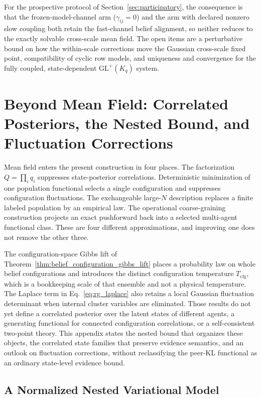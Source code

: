 \documentclass[11pt]{article}
\begin{document}
For the prospective protocol of Section~\ref{sec:participatory}, the consequence is that the frozen-model-channel arm ($\gamma_{ij}=0$) and the arm with declared nonzero slow coupling both retain the fast-channel belief alignment, so neither reduces to the exactly solvable cross-scale mean field. The open items are a perturbative bound on how the within-scale corrections move the Gaussian cross-scale fixed point, compatibility of cyclic row models, and uniqueness and convergence for the fully coupled, state-dependent $\mathrm{GL}^+(K_q)$ system.

\section{Beyond Mean Field: Correlated Posteriors, the Nested Bound, and Fluctuation Corrections}
\label{sec:beyond_mean_field_gauge_vfe}

Mean field enters the present construction in four places. The factorization $Q=\prod_i q_i$ suppresses state-posterior correlations. Deterministic minimization of one population functional selects a single configuration and suppresses configuration fluctuations. The exchangeable large-$N$ description replaces a finite labeled population by an empirical law. The operational coarse-graining construction projects an exact pushforward back into a selected multi-agent functional class. These are four different approximations, and improving one does not remove the other three.

The configuration-space Gibbs lift of Theorem~\ref{thm:belief_configuration_gibbs_lift} places a probability law on whole belief configurations and introduces the distinct configuration temperature $T_{\mathrm{cfg}}$, which is a bookkeeping scale of that ensemble and not a physical temperature. The Laplace term in Eq.~\eqref{eq:rg_laplace} also retains a local Gaussian fluctuation determinant when internal cluster variables are eliminated. Those results do not yet define a correlated posterior over the latent states of different agents, a generating functional for connected configuration correlations, or a self-consistent two-point theory. This appendix states the nested bound that organizes these objects, the correlated state families that preserve evidence semantics, and an outlook on fluctuation corrections, without reclassifying the peer-KL functional as an ordinary state-level evidence bound.

\subsection{A Normalized Nested Variational Model}
\end{document}
